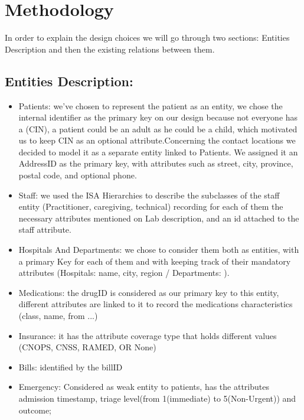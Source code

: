 \documentclass[a4paper,12pt]{article}
\begin{document}
\section{Methodology}
In order to explain the design choices we will go through two sections: Entities Description and then the existing relations between them.
\subsection{Entities Description: }
\begin{itemize}
    \item Patients: we've chosen to represent the patient as an entity, we chose the internal identifier as the primary key on our design because not everyone has a (CIN), a patient could be an adult as he could be a child, which motivated us to keep CIN as an optional attribute.Concerning the contact locations we decided to model it as a separate entity linked to Patients. We assigned it an AddressID as the primary key, with attributes such as street, city, province, postal code, and optional phone.
    \item Staff: we used the ISA Hierarchies to describe the subclasses of the staff entity (Practitioner, caregiving, technical) recording for each of them the necessary attributes mentioned on Lab description, and an id attached to the staff attribute. 
    \item Hospitals And Departments: we chose to consider them both as entities, with a primary Key for each of them and with keeping track of their mandatory attributes (Hospitals: name, city, region / Departments: ).
    \item Medications: the drugID is considered as our primary key to this entity, different attributes are linked to it to record the medications characteristics (class, name, from ...)
    \item Insurance: it has the attribute coverage type that holds different values (CNOPS, CNSS, RAMED, OR None)
    \item Bills: identified by the billID
    \item Emergency: Considered as weak entity to patients, has the attributes admission timestamp, triage level(from 1(immediate) to 5(Non-Urgent)) and outcome;
\end{itemize}
\end{document}
